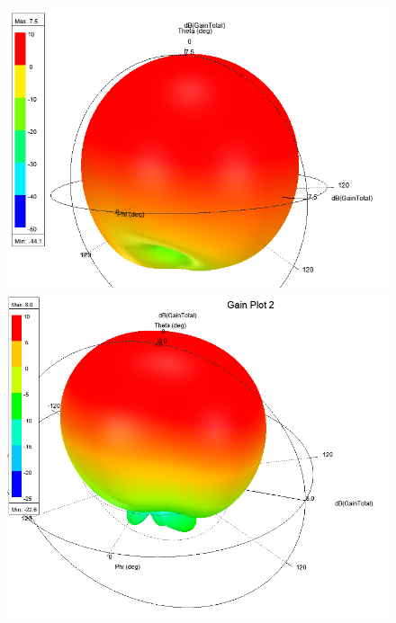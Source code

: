\documentclass[10pt, a4paper]{article}%
\begin{document}
\begin{figure}[ht!]
	\centering
	\begin{minipage}{0.32\textwidth}
		\centering
		\includegraphics[width= 1\textwidth]{RAD_dB_free_space.png}
	\end{minipage}%
	\hfill
	\begin{minipage}{0.32\textwidth}
		\centering
		\includegraphics[width= 1\textwidth]{RAD_dB_phantom.png}
	\end{minipage}
	\hfill
	\begin{minipage}{0.32\textwidth}

\end{minipage}
\end{figure}
\end{document}
